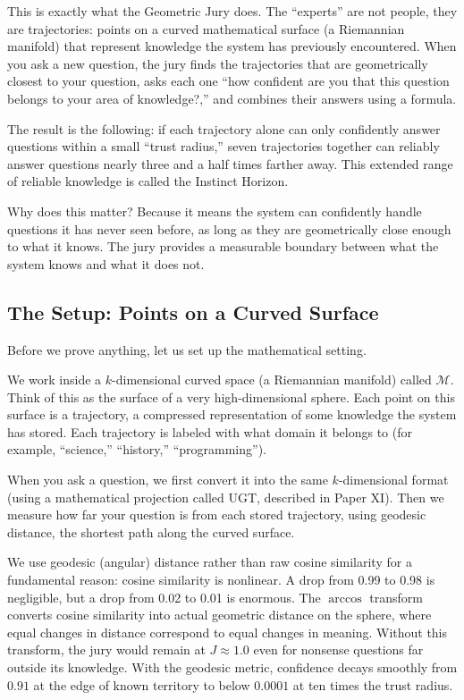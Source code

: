 \documentclass[11pt]{article}
\begin{document}
This is exactly what the Geometric Jury does. The ``experts'' are not
people, they are trajectories: points on a curved mathematical surface
(a Riemannian manifold) that represent knowledge the system has previously
encountered. When you ask a new question, the jury finds the trajectories that
are geometrically closest to your question, asks each one ``how confident are
you that this question belongs to your area of knowledge?,'' and combines their
answers using a formula.

The result is the following: if each trajectory alone can only confidently answer
questions within a small ``trust radius,'' seven trajectories together can
reliably answer questions nearly three and a half times farther away. This
extended range of reliable knowledge is called the Instinct Horizon.

Why does this matter? Because it means the system can confidently handle
questions it has never seen before, as long as they are geometrically close
enough to what it knows. The jury provides a measurable boundary
between what the system knows and what it does not.

\subsection{The Setup: Points on a Curved Surface}

Before we prove anything, let us set up the mathematical setting.

We work inside a $k$-dimensional curved space (a Riemannian manifold) called
$\mathcal{M}$. Think of this as the surface of a very high-dimensional sphere.
Each point on this surface is a trajectory, a compressed
representation of some knowledge the system has stored. Each trajectory is
labeled with what domain it belongs to (for example, ``science,'' ``history,''
``programming'').

When you ask a question, we first convert it into the same $k$-dimensional
format (using a mathematical projection called UGT, described in Paper XI).
Then we measure how far your question is from each stored trajectory, using
geodesic distance, the shortest path along the curved surface.

We use geodesic (angular) distance rather than raw cosine similarity for a
fundamental reason: cosine similarity is nonlinear. A drop from 0.99 to 0.98
is negligible, but a drop from 0.02 to 0.01 is enormous. The $\arccos$
transform converts cosine similarity into actual geometric distance on the
sphere, where equal changes in distance correspond to equal changes in
meaning. Without this transform, the jury would remain at $J \approx 1.0$
even for nonsense questions far outside its knowledge. With the geodesic
metric, confidence decays smoothly from $0.91$ at the edge of known territory
to below $0.0001$ at ten times the trust radius.
\end{document}
